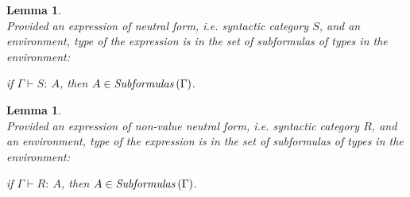 \documentclass[a4paper]{article}
\newcommand{\typecolor}{}
\newcommand{\termcolor}{}
\newcommand{\tp}[1]{{\typecolor #1}}
\newcommand{\tm}[1]{{\termcolor #1}}
\newtheorem{lemma}[theorem]{Lemma}
\newcommand{\env}{\tp{\Gamma}}
\newcommand{\typing}[2]{\tm{#1:\ }\tp{#2}}
\newcommand{\txt}[1]{\text{\textit{#1}}}
\newcommand{\subformulas}[1]{\txt{Subformulas}\,(#1)}
\begin{document}
\begin{lemma}\ \\
\label{sub_S}
Provided an expression of neutral form, i.e. syntactic category $S$,
and an environment, type of the expression is in the set of
subformulas of types in the environment:
 
 if $\env \vdash \typing{S}{A}$, then $A \in \subformulas{\Gamma}$.
\end{lemma}

\begin{lemma}\ \\
\label{sub_R}
Provided an expression of non-value neutral form, i.e. syntactic
category $R$, and an environment, type of the expression is in the set
of subformulas of types in the environment:
 
 if $\Gamma \vdash \typing{R}{A}$, then $A \in \subformulas{\Gamma}$.
\end{lemma}
 
\end{document}
